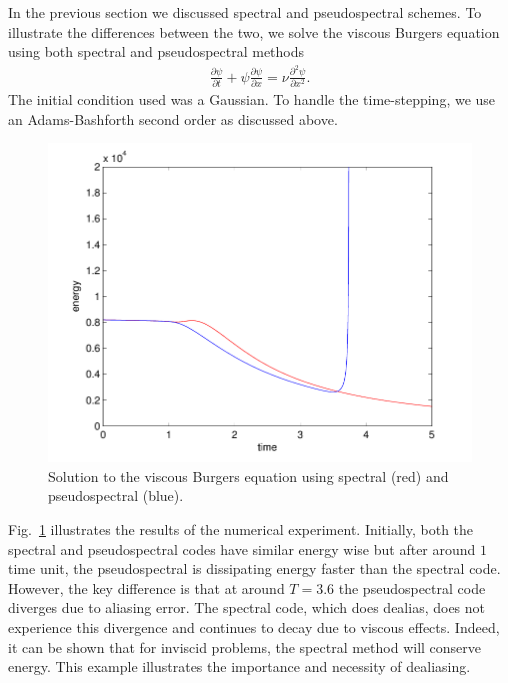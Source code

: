 In the previous section we discussed spectral and pseudospectral schemes. To illustrate the differences between the two, we solve the viscous Burgers equation using both spectral and pseudospectral methods \cite{durran}
\begin{align}
\frac{\partial \psi}{\partial t} + \psi\frac{\partial \psi}{\partial x} = \nu \frac{\partial^{2}\psi}{\partial x^{2}}.
\end{align}
The initial condition used was a Gaussian. To handle the time-stepping, we use an Adams-Bashforth second order as discussed above.
\begin{figure}
\begin{center}
\includegraphics[width=\textwidth]{spec_vs_pspec}
\caption{Solution to the viscous Burgers equation using spectral (red) and pseudospectral (blue).}
\label{spectralvpseudo}
\end{center}
\end{figure}
Fig.~\ref{spectralvpseudo} illustrates the results of the numerical experiment. Initially, both the spectral and pseudospectral codes have similar energy wise but after around $1$ time unit, the pseudospectral is dissipating energy faster than the spectral code. However, the key difference is that at around $T=3.6$ the pseudospectral code diverges due to aliasing error. The spectral code, which does dealias, does not experience this divergence and continues to decay due to viscous effects. Indeed, it can be shown \cite{durran} that for inviscid problems, the spectral method will conserve energy. This example illustrates the importance and necessity of dealiasing. 

